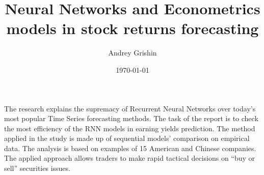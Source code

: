 \documentclass{article}
\title{Neural Networks and Econometrics models in stock returns forecasting}
\author{Andrey Grishin}
\date{\today}
\begin{document}
	\maketitle
	
	The research explains the supremacy of Recurrent Neural Networks over today's most popular Time Series forecasting methods. The task of the report is to check the most efficiency of the RNN models in earning yields prediction. The method applied in the study is made up of sequential models’ comparison on empirical data. The analysis is based on examples of 15 American and Chinese companies.  The applied approach allows traders to make rapid tactical decisions on “buy or sell” securities issues.
	
	
	
\end{document}
